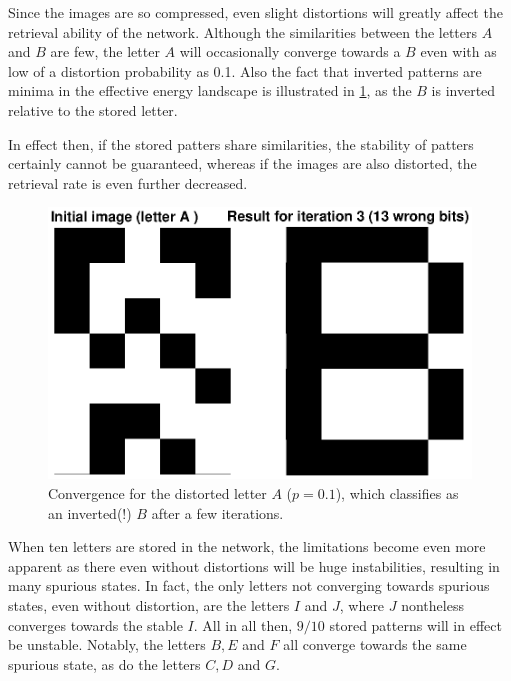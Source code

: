 \documentclass[a4paper,12pt]{article}
\theoremstyle{plain}
\theoremstyle{definition}
\begin{document}
      Since the images are so compressed, even slight distortions will greatly
      affect the retrieval ability of the network. Although the similarities
      between the letters $A$ and $B$ are few, the letter $A$ will occasionally
      converge towards a $B$ even with as low of a distortion probability as
      0.1. Also the fact that inverted patterns are minima in the effective
      energy landscape is illustrated in \cref{fig:12_distortion}, as the
      $B$ is inverted relative to the stored letter. 
      
      In effect then, if the stored patters share similarities, the
      stability of patters certainly cannot be guaranteed, whereas if the images
      are also distorted, the retrieval rate is even further decreased.
      
      \begin{figure}[H]
         \centering
         \includegraphics[scale=.6]{12_distortion}
         \caption{Convergence for the distorted letter $A$ ($p=0.1$), which
            classifies as an inverted(!)
            $B$ after a few iterations.}
         \label{fig:12_distortion}
      \end{figure}

      When ten letters are stored in the network, the limitations become even
      more apparent as there even without distortions will be huge
      instabilities, resulting in many spurious states. In fact, the only
      letters not converging towards spurious states, even without distortion, are the
      letters $I$ and $J$, where $J$ nontheless converges towards the stable $I$. 
      All in all then, $9/10$ stored patterns will in effect be unstable. Notably, the 
      letters $B, E$ and $F$ all converge towards the same spurious
      state, as do the letters $C, D$ and $G$. 
\end{document}
